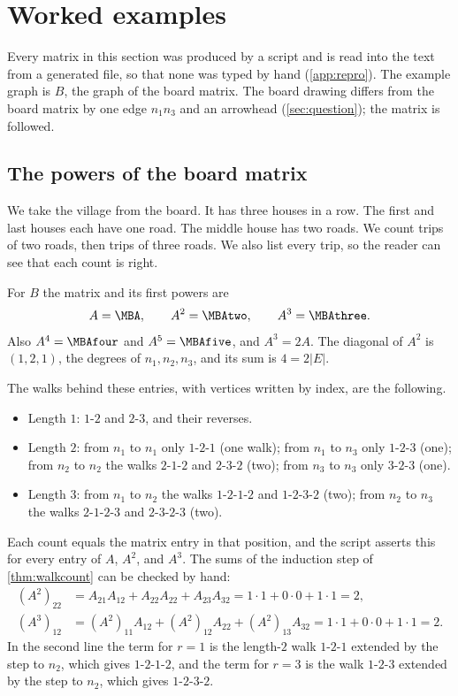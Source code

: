 \section{Worked examples}\label{sec:example}

Every matrix in this section was produced by a script and is read into the text from a generated file, so that none was typed by hand (\cref{app:repro}).
The example graph is $B$, the graph of the board matrix.
The board drawing differs from the board matrix by one edge $n_1n_3$ and an arrowhead (\cref{sec:question}); the matrix is followed.

\subsection{The powers of the board matrix}\label{sec:powers}

\plainwords We take the village from the board.
It has three houses in a row.
The first and last houses each have one road.
The middle house has two roads.
We count trips of two roads, then trips of three roads.
We also list every trip, so the reader can see that each count is right.

\begin{example}\label{ex:boardpowers}
For $B$ the matrix and its first powers are
\[
A=\MBA,\qquad A^2=\MBAtwo,\qquad A^3=\MBAthree .
\]
Also $A^4=\MBAfour$ and $A^5=\MBAfive$, and $A^3=2A$.
The diagonal of $A^2$ is $(1,2,1)$, the degrees of $n_1,n_2,n_3$, and its sum is $4=2|E|$.
\end{example}

The walks behind these entries, with vertices written by index, are the following.
\begin{itemize}
\item Length $1$: $1\text{-}2$ and $2\text{-}3$, and their reverses.
\item Length $2$: from $n_1$ to $n_1$ only $1\text{-}2\text{-}1$ (one walk); from $n_1$ to $n_3$ only $1\text{-}2\text{-}3$ (one); from $n_2$ to $n_2$ the walks $2\text{-}1\text{-}2$ and $2\text{-}3\text{-}2$ (two); from $n_3$ to $n_3$ only $3\text{-}2\text{-}3$ (one).
\item Length $3$: from $n_1$ to $n_2$ the walks $1\text{-}2\text{-}1\text{-}2$ and $1\text{-}2\text{-}3\text{-}2$ (two); from $n_2$ to $n_3$ the walks $2\text{-}1\text{-}2\text{-}3$ and $2\text{-}3\text{-}2\text{-}3$ (two).
\end{itemize}
Each count equals the matrix entry in that position, and the script asserts this for every entry of $A$, $A^2$, and $A^3$.
The sums of the induction step of \cref{thm:walkcount} can be checked by hand:
\begin{align*}
(A^2)_{22}&=A_{21}A_{12}+A_{22}A_{22}+A_{23}A_{32}=1\cdot1+0\cdot0+1\cdot1=2,\\
(A^3)_{12}&=(A^2)_{11}A_{12}+(A^2)_{12}A_{22}+(A^2)_{13}A_{32}=1\cdot1+0\cdot0+1\cdot1=2.
\end{align*}
In the second line the term for $r=1$ is the length-$2$ walk $1\text{-}2\text{-}1$ extended by the step to $n_2$, which gives $1\text{-}2\text{-}1\text{-}2$, and the term for $r=3$ is the walk $1\text{-}2\text{-}3$ extended by the step to $n_2$, which gives $1\text{-}2\text{-}3\text{-}2$.

